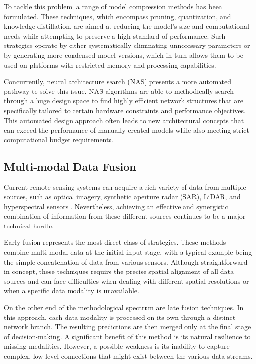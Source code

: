\documentclass[12pt,a4paper]{article}
\begin{document}
To tackle this problem, a range of model compression methods has been formulated. These techniques, which encompass pruning, quantization, and knowledge distillation, are aimed at reducing the model's size and computational needs while attempting to preserve a high standard of performance. Such strategies operate by either systematically eliminating unnecessary parameters or by generating more condensed model versions, which in turn allows them to be used on platforms with restricted memory and processing capabilities.

Concurrently, neural architecture search (NAS) presents a more automated pathway to solve this issue. NAS algorithms are able to methodically search through a huge design space to find highly efficient network structures that are specifically tailored to certain hardware constraints and performance objectives. This automated design approach often leads to new architectural concepts that can exceed the performance of manually created models while also meeting strict computational budget requirements.

\subsection{Multi-modal Data Fusion}
Current remote sensing systems can acquire a rich variety of data from multiple sources, such as optical imagery, synthetic aperture radar (SAR), LiDAR, and hyperspectral sensors \cite{zhu2017deep}. Nevertheless, achieving an effective and synergistic combination of information from these different sources continues to be a major technical hurdle.

Early fusion represents the most direct class of strategies. These methods combine multi-modal data at the initial input stage, with a typical example being the simple concatenation of data from various sensors. Although straightforward in concept, these techniques require the precise spatial alignment of all data sources and can face difficulties when dealing with different spatial resolutions or when a specific data modality is unavailable.

On the other end of the methodological spectrum are late fusion techniques. In this approach, each data modality is processed on its own through a distinct network branch. The resulting predictions are then merged only at the final stage of decision-making. A significant benefit of this method is its natural resilience to missing modalities. However, a possible weakness is its inability to capture complex, low-level connections that might exist between the various data streams.
\end{document}
